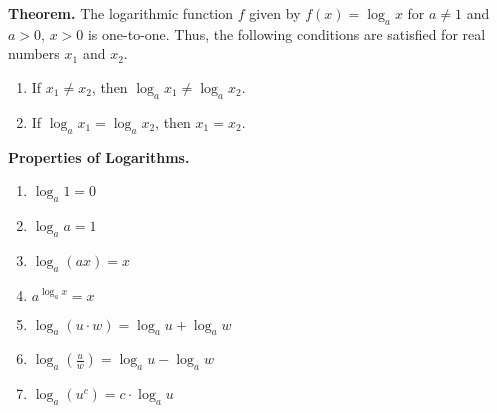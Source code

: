 \documentclass{report}
\begin{document}
      \bigbreak \noindent 
      \begin{mdframed}
        \textbf{Theorem.}
        \bigbreak \noindent 
        The logarithmic function $f$ given by $f(x) = \log_a x$ for $a \neq 1$ and $a > 0$, $x > 0$ is one-to-one.
        \bigbreak \noindent 
        Thus, the following conditions are satisfied for real numbers $x_1$ and $x_2$.
        \begin{enumerate}
          \item If $x_1 \neq x_2$, then $\log_a x_1 \neq \log_a x_2$.
          \item If $\log_a x_1 = \log_a x_2$, then $x_1 = x_2$.
      \end{enumerate}
      \end{mdframed}
      \bigbreak \noindent \bigbreak \noindent 
      \bigbreak \noindent 

      \pagebreak \bigbreak \noindent
      \bigbreak \noindent 
      \begin{mdframed}
        \textbf{Properties of Logarithms.}
        \bigbreak \noindent 
        \begin{enumerate}
          \item $\log_a 1 = 0$
          \item $\log_a a = 1$
          \item $\log_a (ax) = x$
          \item $a^{\log_a x} = x$
          \item $\log_a(u \cdot w) = \log_a u + \log_a w$
          \item $\log_a \left(\frac{u}{w}\right) = \log_a u - \log_a w$
          \item $\log_a(u^c) = c \cdot \log_a u$
        \end{enumerate}
      \end{mdframed}
\end{document}
